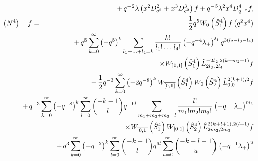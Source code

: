 \documentclass[a4paper,11pt,oneside]{article}
\begin{document}
\begin{eqnarray}
&&\hspace*{-1.2cm}+\,q^{-2}\lambda \left(
x^{2}D_{q^{2}}^{2}+x^{3}D_{q^{2}}^{3}\right) f+q^{-5}\lambda
^{2}x^{4}D_{q^{-2}}^{4}f,  \nonumber \\
\left( N^{4}\right) ^{-1}f &=&\frac{1}{2}q^{5}W_{0}\left(\hat{S}^4_1
\right) f\left( q^{2}x^{4}\right)  
\nonumber \\
&&\hspace*{-1.2cm}+\,q^{5}\sum_{k=0}^{\infty }\left( -q^{5}\right)
^{k}\sum_{l_{1}+\ldots +l_{4}=k}\frac{k!}{l_{1}!\ldots l_{4}!}\left(
-q^{-4}\lambda _{+}\right) ^{l_{1}}q^{3\left( l_{2}-l_{3}-l_{4}\right) } 
\nonumber \\
&&\hspace*{-.0cm}\times
 W_{\left] 0,1\right] }\left(\hat{S}^4_1
 \right) \hat{L}^{-2l_2,2(k-m_2+1)}_{2l_3,2l_4} f
  \nonumber \\
&&\hspace*{-1.2cm}+\,\frac{1}{2}q^{-3}\sum_{k=0}^{\infty }\left(
-2q^{-8}\right) ^{k}W_{\overline{\left[ 0,1\right] }}\left(\hat{S}^4_1
\right) 
W_{0}\left(
\hat{S}^4_2 
\right) \hat{L}^{2(k+1),2}_{0,0} f
\nonumber \\
&&\hspace*{-1.2cm}+\,q^{-3}\sum_{k=0}^{\infty }\left( -q^{-8}\right)
^{k}\sum_{l=0}^{\infty }{-k-1 \choose l}q^{-6l}\sum_{m_{1}+m_{2}+m_{3}=l}%
\frac{l!}{m_{1}!m_{2}!m_{3}!}\left( -q^{-1}\lambda _{+}\right) ^{m_{1}} 
\nonumber\\&&\hspace*{-0.cm}
\times W_{\overline{\left[ 0,1\right] }}\left(\hat{S}^4_1
 \right)  
 W_{\left] 0,1\right] }\left( 
\hat{S}^4_2
\right) \hat{L}^{2(k+l+1),2(l+1)}_{2m_2,2m_3} f
\nonumber \\
&&\hspace*{-1.2cm}+\,q^{3}\sum_{k=0}^{\infty }\left( -q^{-2}\right)
^{k}\sum_{l=0}^{\infty }{-k-1 \choose l}q^{6l}\sum_{u=0}^{\infty
}{-k-l-1 \choose u}\left( -q^{-1}\lambda _{+}\right) ^{u}\nonumber\\

\end{eqnarray}
\end{document}
